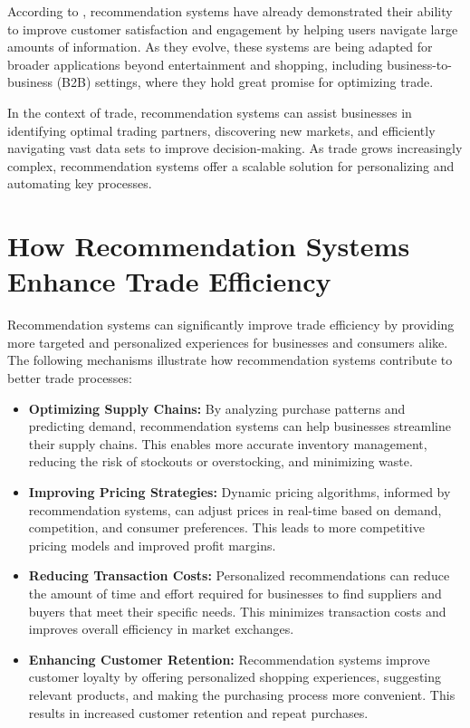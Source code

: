 \documentclass[10pt,twoside,slovak,a4paper]{article}
\begin{document}
\noindent According to \cite{author2023}, recommendation systems have already demonstrated their ability to improve customer satisfaction and engagement by helping users navigate large amounts of information. As they evolve, these systems are being adapted for broader applications beyond entertainment and shopping, including business-to-business (B2B) settings, where they hold great promise for optimizing trade.

In the context of trade, recommendation systems can assist businesses in identifying optimal trading partners, discovering new markets, and efficiently navigating vast data sets to improve decision-making. As trade grows increasingly complex, recommendation systems offer a scalable solution for personalizing and automating key processes.



\section{How Recommendation Systems Enhance Trade Efficiency}

Recommendation systems can significantly improve trade efficiency by providing more targeted and personalized experiences for businesses and consumers alike. The following mechanisms illustrate how recommendation systems contribute to better trade processes:

\begin{itemize}
    \item \textbf{Optimizing Supply Chains:} By analyzing purchase patterns and predicting demand, recommendation systems can help businesses streamline their supply chains. This enables more accurate inventory management, reducing the risk of stockouts or overstocking, and minimizing waste.
    
    \item \textbf{Improving Pricing Strategies:} Dynamic pricing algorithms, informed by recommendation systems, can adjust prices in real-time based on demand, competition, and consumer preferences. This leads to more competitive pricing models and improved profit margins.
    
    \item \textbf{Reducing Transaction Costs:} Personalized recommendations can reduce the amount of time and effort required for businesses to find suppliers and buyers that meet their specific needs. This minimizes transaction costs and improves overall efficiency in market exchanges.
    
    \item \textbf{Enhancing Customer Retention:} Recommendation systems improve customer loyalty by offering personalized shopping experiences, suggesting relevant products, and making the purchasing process more convenient. This results in increased customer retention and repeat purchases.
\end{itemize}
\end{document}
